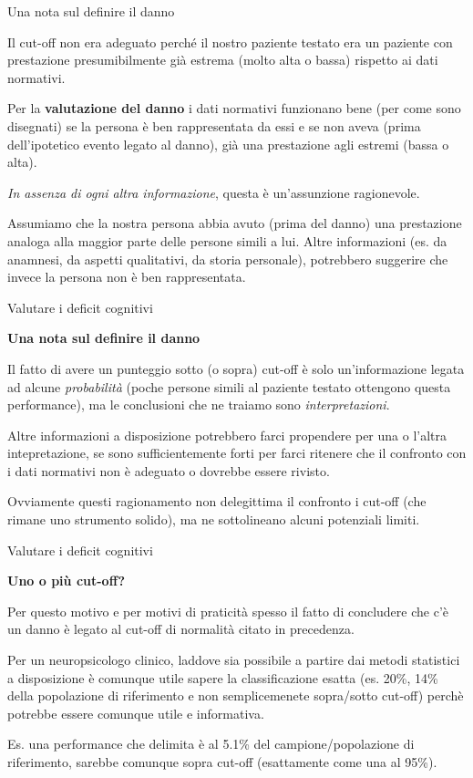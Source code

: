 \documentclass[
  ignorenonframetext,
]{beamer}
\begin{document}
\begin{frame}{Una nota sul definire il danno}
\label{una-nota-sul-definire-il-danno}
\small

Il cut-off non era adeguato perché il nostro paziente testato era un
paziente con prestazione presumibilmente già estrema (molto alta o
bassa) rispetto ai dati normativi.

Per la \textbf{valutazione del danno} i dati normativi funzionano bene
(per come sono disegnati) se la persona è ben rappresentata da essi e se
non aveva (prima dell'ipotetico evento legato al danno), già una
prestazione agli estremi (bassa o alta).

\emph{In assenza di ogni altra informazione}, questa è un'assunzione
ragionevole.

Assumiamo che la nostra persona abbia avuto (prima del danno) una
prestazione analoga alla maggior parte delle persone simili a lui. Altre
informazioni (es. da anamnesi, da aspetti qualitativi, da storia
personale), potrebbero suggerire che invece la persona non è ben
rappresentata.
\end{frame}

\begin{frame}{Valutare i deficit cognitivi}
\label{valutare-i-deficit-cognitivi-5}
\begin{center}
  \textbf{Una nota sul definire il danno}
\end{center}

Il fatto di avere un punteggio sotto (o sopra) cut-off è solo
un'informazione legata ad alcune \emph{probabilità} (poche persone
simili al paziente testato ottengono questa performance), ma le
conclusioni che ne traiamo sono \emph{interpretazioni}.

Altre informazioni a disposizione potrebbero farci propendere per una o
l'altra intepretazione, se sono sufficientemente forti per farci
ritenere che il confronto con i dati normativi non è adeguato o dovrebbe
essere rivisto.

Ovviamente questi ragionamento non delegittima il confronto i cut-off
(che rimane uno strumento solido), ma ne sottolineano alcuni potenziali
limiti.
\end{frame}

\begin{frame}{Valutare i deficit cognitivi}
\label{valutare-i-deficit-cognitivi-6}
\begin{center}
  \textbf{Uno o più cut-off?}
\end{center}

Per questo motivo e per motivi di praticità spesso il fatto di
concludere che c'è un danno è legato al cut-off di normalità citato in
precedenza.

Per un neuropsicologo clinico, laddove sia possibile a partire dai
metodi statistici a disposizione è comunque utile sapere la
classificazione esatta (es. 20\%, 14\% della popolazione di riferimento
e non semplicemenete sopra/sotto cut-off) perchè potrebbe essere
comunque utile e informativa.

Es. una performance che delimita è al 5.1\% del campione/popolazione di
riferimento, sarebbe comunque sopra cut-off (esattamente come una al
95\%).
\end{frame}
\end{document}
